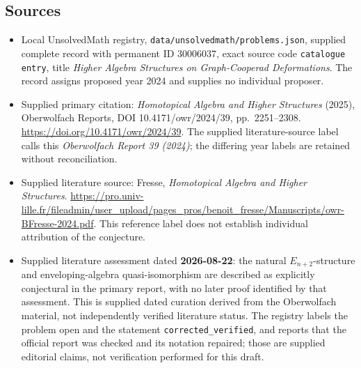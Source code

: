 \documentclass[11pt]{article}
\begin{document}
\subsection{Sources}
\begin{itemize}
\item Local UnsolvedMath registry, \texttt{data/unsolvedmath/problems.json}, supplied complete record with permanent ID \(30006037\), exact source code \texttt{catalogue entry}, title \emph{Higher Algebra Structures on Graph-Cooperad Deformations}. The record assigns proposed year 2024 and supplies no individual proposer.
\item Supplied primary citation: \emph{Homotopical Algebra and Higher Structures} (2025), Oberwolfach Reports, DOI 10.4171/owr/2024/39, pp.~2251--2308. \url{https://doi.org/10.4171/owr/2024/39}. The supplied literature-source label calls this \emph{Oberwolfach Report 39 (2024)}; the differing year labels are retained without reconciliation.
\item Supplied literature source: Fresse, \emph{Homotopical Algebra and Higher Structures}. \url{https://pro.univ-lille.fr/fileadmin/user_upload/pages_pros/benoit_fresse/Manuscripts/owr-BFresse-2024.pdf}. This reference label does not establish individual attribution of the conjecture.
\item Supplied literature assessment dated \textbf{2026-08-22}: the natural \(E_{n+2}\)-structure and enveloping-algebra quasi-isomorphism are described as explicitly conjectural in the primary report, with no later proof identified by that assessment. This is supplied dated curation derived from the Oberwolfach material, not independently verified literature status. The registry labels the problem open and the statement \texttt{corrected\_verified}, and reports that the official report was checked and its notation repaired; those are supplied editorial claims, not verification performed for this draft.
\end{itemize}
\end{document}
